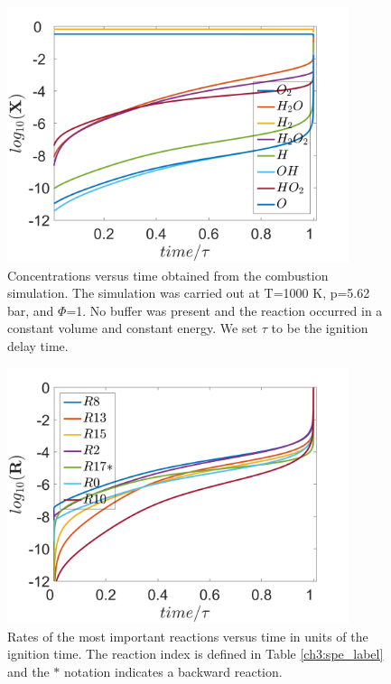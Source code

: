 \paragraph{}
\begin{figure}[htbp]
	\caption[Concentrations versus time of H$_2$-O$_2$ combustion system]{Concentrations versus time obtained from the combustion simulation.  The simulation was carried out at T=1000 K, p=5.62 bar, and $\Phi$=1.  No buffer was present and the reaction occurred in a constant volume and constant energy. We set $\tau$ to be the ignition delay time.}
    \begin{center}
	\includegraphics[width=100mm]{figs/chapter3/fig1.png}
    \end{center}
\label{ch3:fig1}
\end{figure}
\begin{figure}[htbp]
	\caption[Reaction rates versus time of H$_2$-O$_2$ combustion system]{Rates of the most important reactions versus time in units of
the ignition time. The reaction index is defined in Table \ref{ch3:spe_label} and the $\ast$ notation indicates a backward reaction.}
    \begin{center}
	\includegraphics[width=100mm]{figs/chapter3/fig2.png}
    \end{center}
\label{ch3:fig2}
\end{figure}
